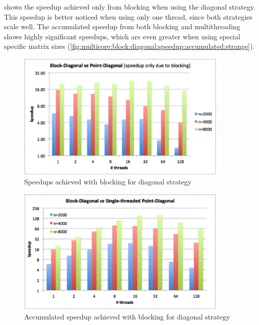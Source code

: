 \documentclass[../thesis]{subfiles}
\begin{document}
	 shows the speedup achieved only from blocking when using the diagonal strategy. This speedup is better noticed when using only one thread, since both strategies scale well. The accumulated speedup from both blocking and multithreading shows highly significant speedups, which are even greater when using special specific matrix sizes (\cref{fig:multicore:block:diagonal:speedup:accumulated:strange}).

	\begin{figure}[hp]
		\begin{center}
			\includegraphics[width=0.9\textwidth]{assets/images/multicore/diagonal-speedup.png}
		\end{center}
		\caption{Speedups achieved with blocking for diagonal strategy}
		\label{fig:multicore:block:diagonal:speedup}
	\end{figure}

	\begin{figure}[hp]
		\begin{center}
			\includegraphics[width=0.9\textwidth]{assets/images/multicore/diagonal-block-stpoint-speedup.png}
		\end{center}
		\caption{Accumulated speedup achieved with blocking for diagonal strategy}
		\label{fig:multicore:block:diagonal:speedup:accumulated}
	\end{figure}
\end{document}
